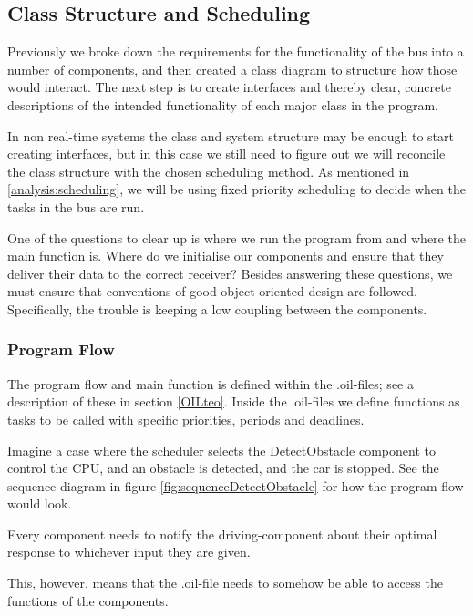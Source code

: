 \subsection{Class Structure and Scheduling}

Previously we broke down the requirements for the functionality of the bus into a number of components, and then created a class diagram  to structure how those would interact. The next step is to create interfaces and thereby clear, concrete descriptions of the intended functionality of each major class in the program. 

In non real-time systems the class and system structure may be enough to start creating interfaces, but in this case we still need to figure out we will reconcile the class structure with the chosen scheduling method. As mentioned in \ref{analysis:scheduling}, we will be using fixed priority scheduling to decide when the tasks in the bus are run. 

One of the questions to clear up is where we run the program from and where the main function is. Where do we initialise our components and ensure that they deliver their data to the correct receiver? Besides answering these questions, we must ensure that conventions of good object-oriented design are followed. Specifically, the trouble is keeping a low coupling between the components. 

\subsubsection{Program Flow}
The program flow and main function is defined within the .oil-files; see a description of these in section \ref{OILteo}. Inside the .oil-files we define functions as tasks to be called with specific priorities, periods and deadlines. 

Imagine a case where the scheduler selects the DetectObstacle component to control the CPU, and an obstacle is detected, and the car is stopped. See the sequence diagram in figure \ref{fig:sequenceDetectObstacle} for how the program flow would look.




Every component needs to notify the driving-component about their optimal response to whichever input they are given. 

This, however, means that the .oil-file needs to somehow be able to access the functions of the components. 



